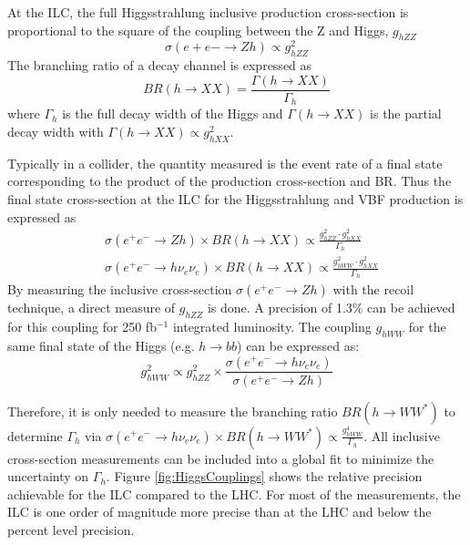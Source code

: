 At the ILC, the full Higgsstrahlung inclusive production cross-section is proportional to the square of the coupling between the Z and Higgs, $g_{hZZ}$
\begin{equation}
  \sigma(e+e- \rightarrow Zh) \propto g^2_{hZZ}
\end{equation}
The branching ratio of a decay channel is expressed as
\begin{equation}
  BR(h \rightarrow XX) = \frac{\Gamma(h \rightarrow XX)}{\Gamma_{h}}
\end{equation}
where $\Gamma_{h}$ is the full decay width of the Higgs and $\Gamma(h \rightarrow XX)$ is the partial decay width with $\Gamma(h \rightarrow XX) \propto g^2_{hXX}$.

Typically in a collider, the quantity measured is the event rate of a final state corresponding to the product of the production cross-section and BR. Thus the final state cross-section at the ILC for the Higgsstrahlung and VBF production is expressed as
\begin{equation}
  \begin{aligned}
    &\sigma(e^+e^- \rightarrow Zh) \times BR(h \rightarrow XX) \propto \frac{g^2_{hZZ} \cdot g^2_{hXX}}{\Gamma_{h}}\\
    &\sigma(e^+e^- \rightarrow h\nu_e\nu_e) \times BR(h \rightarrow XX) \propto \frac{g^2_{hWW} \cdot g^2_{hXX}}{\Gamma_{h}}
  \end{aligned}
\end{equation}
By measuring the inclusive cross-section $\sigma(e^+e^- \rightarrow Zh)$ with the recoil technique, a direct measure of $g_{hZZ}$ is done. A precision of 1.3\% can be achieved for this coupling for 250 fb$^{-1}$ integrated luminosity. The coupling $g_{hWW}$ for the same final state of the Higgs (e.g. $h \rightarrow bb$) can be expressed as:
\begin{equation}
  g^2_{hWW} \propto g^2_{hZZ} \times \frac{\sigma(e^+e^- \rightarrow h\nu_e\nu_e)}{\sigma(e^+e^- \rightarrow Zh)}
\end{equation}

Therefore, it is only needed to measure the branching ratio $BR(h \rightarrow WW^*)$ to determine $\Gamma_{h}$ via $\sigma(e^+e^- \rightarrow h\nu_e\nu_e) \times BR(h \rightarrow WW^*) \propto \frac{g^4_{hWW}}{\Gamma_{h}}$. All inclusive cross-section measurements can be included into a global fit to minimize the uncertainty on $\Gamma_{h}$. Figure \ref{fig:HiggsCouplings} shows the relative precision achievable for the ILC compared to the LHC. For most of the measurements, the ILC is one order of magnitude more precise than at the LHC and below the percent level precision.

